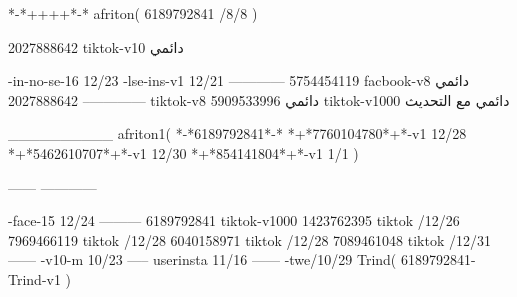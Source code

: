 *-*++++*-*
afriton(
6189792841 /8/8
)

2027888642 tiktok-v10
دائمي

-in-no-se-16 12/23
-lse-ins-v1 12/21
------------
5754454119 facbook-v8
دائمي
--------------
2027888642 tiktok-v8
دائمي
5909533996 tiktok-v1000
دائمي مع التحديث

__________
afriton1(
*-*6189792841*-*
*+*7760104780*+*-v1 12/28
*+*5462610707*+*-v1 12/30
*+*854141804*+*-v1 1/1
)

------
------------

-face-15 12/24
---------
6189792841 tiktok-v1000
1423762395 tiktok /12/26
7969466119 tiktok /12/28
6040158971 tiktok /12/28
7089461048 tiktok /12/31
------
-v10-m 10/23
-----
userinsta 11/16
------
-twe/10/29
Trind(
6189792841-Trind-v1 
)
